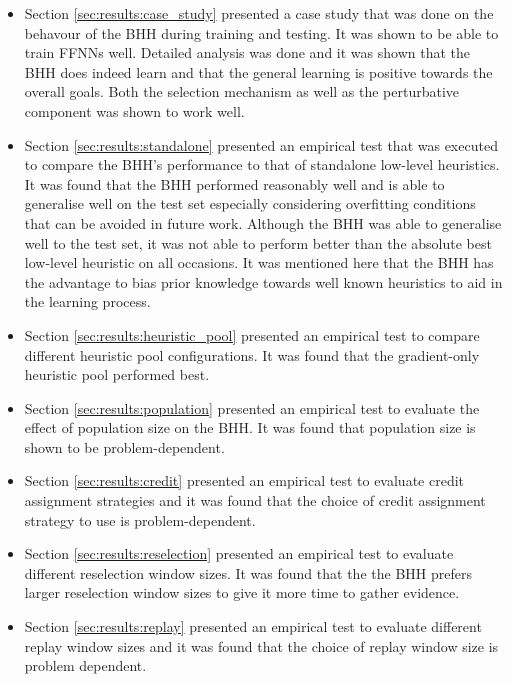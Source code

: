 \begin{itemize}
    \item Section \ref{sec:results:case_study} presented a case study that was done on the behavour of the \Ac{BHH} during training and testing. It was shown to be able to train \acp{FFNN} well. Detailed analysis was done and it was shown that the \Ac{BHH} does indeed learn and that the general learning is positive towards the overall goals. Both the selection mechanism as well as the perturbative component was shown to work well.
    
    \item Section \ref{sec:results:standalone} presented an empirical test that was executed to compare the \Ac{BHH}'s performance to that of standalone low-level heuristics. It was found that the \Ac{BHH} performed reasonably well and is able to generalise well on the test set especially considering overfitting conditions that can be avoided in future work. Although the \Ac{BHH} was able to generalise well to the test set, it was not able to perform better than the absolute best low-level heuristic on all occasions. It was mentioned here that the \Ac{BHH} has the advantage to bias prior knowledge towards well known heuristics to aid in the learning process.
    
    \item Section \ref{sec:results:heuristic_pool} presented an empirical test to compare different heuristic pool configurations. It was found that the gradient-only heuristic pool performed best.
    
    \item Section \ref{sec:results:population} presented an empirical test to evaluate the effect of population size on the \Ac{BHH}. It was found that population size is shown to be problem-dependent.
    
    \item Section \ref{sec:results:credit} presented an empirical test to evaluate credit assignment strategies and it was found that the choice of credit assignment strategy to use is problem-dependent.
    
    \item Section \ref{sec:results:reselection} presented an empirical test to evaluate different reselection window sizes. It was found that the the \Ac{BHH} prefers larger reselection window sizes to give it more time to gather evidence.
    
    \item Section \ref{sec:results:replay} presented an empirical test to evaluate different replay window sizes and it was found that the choice of replay window size is problem dependent.
    

\end{itemize}
